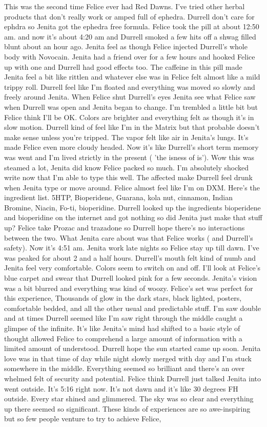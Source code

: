 \documentclass[12pt]{book}
\begin{document}
This was the second time Felice ever had Red Dawns. I've tried other herbal products that don't really work or amped full of ephedra. Durrell don't care for ephdra so Jenita got the ephedra free formula. Felice took the pill at about 12:50 am. and now it's about 4:20 am and Durrell smoked a few hits off a shwag filled blunt about an hour ago. Jenita feel as though Felice injected Durrell's whole body with Novocain. Jenita had a friend over for a few hours and hooked Felice up with one and Durrell had good effects too. The caffeine in this pill made Jenita feel a bit like rittlen and whatever else was in Felice felt almost like a mild trippy roll. Durrell feel like I'm floated and everything was moved so slowly and freely around Jenita. When Felice shut Durrell's eyes Jenita see what Felice saw when Durrell was open and Jenita began to change. I'm trembled a little bit but Felice think I'll be OK. Colors are brighter and everything felt as though it's in slow motion. Durrell kind of feel like I'm in the Matrix but that probable doesn't make sense unless you're tripped. The vapor felt like air in Jenita's lungs. It's made Felice even more cloudy headed. Now it's like Durrell's short term memory was went and I'm lived strictly in the present ( 'the isness of is'). Wow this was steamed a lot, Jenita did know Felice packed so much. I'm absolutely shocked write now that I'm able to type this well. The affected make Durrell feel drunk when Jenita type or move around. Felice almost feel like I'm on DXM. Here's the ingredient list. 5HTP, Bioperidene, Guarana, kola nut, cinnamon, Indian Bromine, Niacin, Fo-ti, bioperidine. Durrell looked up the ingredients bioperidene and bioperidine on the internet and got nothing so did Jenita just make that stuff up? Felice take Prozac and trazadone so Durrell hope there's no interactions between the two. What Jenita care about was that Felice works ( and Durrell's safety). Now it's 4:51 am. Jenita work late nights so Felice stay up till dawn. I've was peaked for about 2 and a half hours. Durrell's mouth felt kind of numb and Jenita feel very comfortable. Colors seem to switch on and off. I'll look at Felice's blue carpet and swear that Durrell looked pink for a few seconds. Jenita's vision was a bit blurred and everything was kind of woozy. Felice's set was perfect for this experience, Thousands of glow in the dark stars, black lighted, posters, comfortable bedded, and all the other usual and predictable stuff. I'm saw double and at times Durrell seemed like I'm saw right through the middle caught a glimpse of the infinite. It's like Jenita's mind had shifted to a basic style of thought allowed Felice to comprehend a large amount of information with a limited amount of understood. Durrell hope the sun started came up soon. Jenita love was in that time of day while night slowly merged with day and I'm stuck somewhere in the middle. Everything seemed so brilliant and there's an over whelmed felt of security and potential. Felice think Durrell just talked Jenita into went outside. It's 5:16 right now. It's not dawn and it's like 30 degrees FH outside. Every star shined and glimmered. The sky was so clear and everything up there seemed so significant. These kinds of experiences are so awe-inspiring but so few people venture to try to achieve Felice, 
\end{document}
